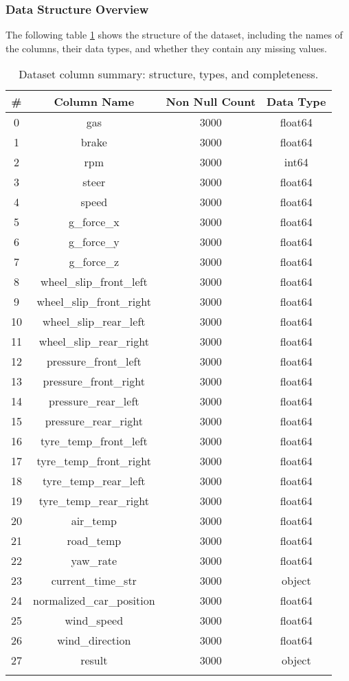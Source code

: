 \documentclass[a4paper,final,12pt]{report}
\begin{document}
\subsubsection{Data Structure Overview}
The following table \ref{tab:dataset_structure} shows the structure of the dataset, including the names of the columns, their data types, and whether they contain any missing values.

\begin{longtable}{|c|c|c|c|}
\hline
\textbf{\#} & \textbf{Column Name} & \textbf{Non Null Count} & \textbf{Data Type} \\
\hline
0 & gas & 3000 & float64 \\
1 & brake & 3000 & float64 \\
2 & rpm & 3000 & int64 \\
3 & steer & 3000 & float64 \\
4 & speed & 3000 & float64 \\
5 & g\_force\_x & 3000 & float64 \\
6 & g\_force\_y & 3000 & float64 \\
7 & g\_force\_z & 3000 & float64 \\
8 & wheel\_slip\_front\_left & 3000 & float64 \\
9 & wheel\_slip\_front\_right & 3000 & float64 \\
10 & wheel\_slip\_rear\_left & 3000 & float64 \\
11 & wheel\_slip\_rear\_right & 3000 & float64 \\
12 & pressure\_front\_left & 3000 & float64 \\
13 & pressure\_front\_right & 3000 & float64 \\
14 & pressure\_rear\_left & 3000 & float64 \\
15 & pressure\_rear\_right & 3000 & float64 \\
16 & tyre\_temp\_front\_left & 3000 & float64 \\
17 & tyre\_temp\_front\_right & 3000 & float64 \\
18 & tyre\_temp\_rear\_left & 3000 & float64 \\
19 & tyre\_temp\_rear\_right & 3000 & float64 \\
20 & air\_temp & 3000 & float64 \\
21 & road\_temp & 3000 & float64 \\
22 & yaw\_rate & 3000 & float64 \\
23 & current\_time\_str & 3000 & object \\
24 & normalized\_car\_position & 3000 & float64 \\
25 & wind\_speed & 3000 & float64 \\
26 & wind\_direction & 3000 & float64 \\
27 & result & 3000 & object \\
\hline
\caption{Dataset column summary: structure, types, and completeness.}
\label{tab:dataset_structure}
\end{longtable}
\end{document}
